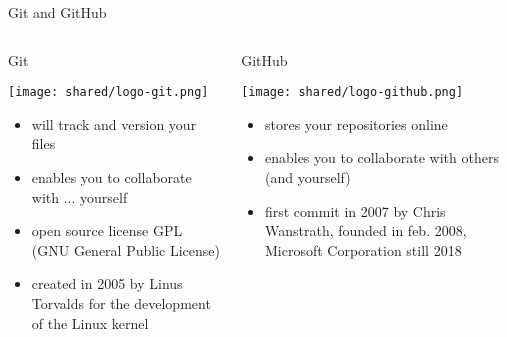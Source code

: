\begin{frame}{Git and GitHub}
\begin{columns}
   \begin{block}{Git}
   \begin{center}
       \texttt{[image: shared/logo-git.png]}
   \end{center}
   \begin{itemize}
       \item will track and version your files
       \item enables you to collaborate with ... yourself
       \item open source license GPL (GNU General Public License)
       \item created in 2005 by Linus Torvalds for the development of the Linux kernel
   \end{itemize}
\end{block}
 \begin{block}{GitHub}
 \begin{center}
      \texttt{[image: shared/logo-github.png]}
 \end{center}
  \begin{itemize}
      \item stores your  repositories online
      \item enables you to collaborate with others (and yourself)
      \item first commit in 2007 by Chris Wanstrath, founded in feb. 2008, Microsoft Corporation still 2018
  \end{itemize}
\end{block}
\end{columns}
\end{frame}